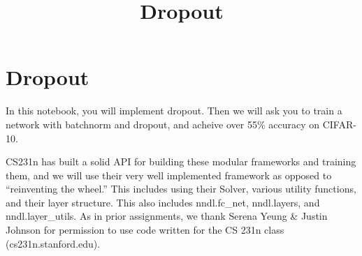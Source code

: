 \documentclass[11pt]{article}
\title{Dropout}
\begin{document}
    
    
    \maketitle
    
    

    
    \hypertarget{dropout}{%
\section{Dropout}\label{dropout}}

In this notebook, you will implement dropout. Then we will ask you to
train a network with batchnorm and dropout, and acheive over 55\%
accuracy on CIFAR-10.

CS231n has built a solid API for building these modular frameworks and
training them, and we will use their very well implemented framework as
opposed to ``reinventing the wheel.'' This includes using their Solver,
various utility functions, and their layer structure. This also includes
nndl.fc\_net, nndl.layers, and nndl.layer\_utils. As in prior
assignments, we thank Serena Yeung \& Justin Johnson for permission to
use code written for the CS 231n class (cs231n.stanford.edu).
\end{document}
